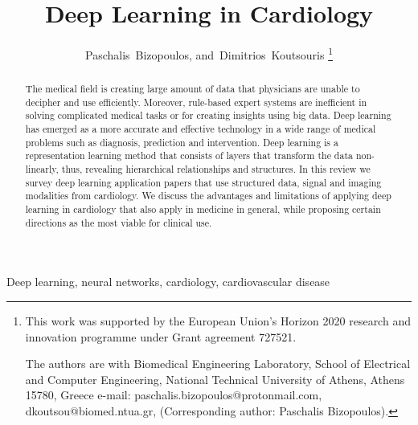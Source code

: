 \documentclass[journal]{IEEEtran}
\begin{document}
\title{Deep Learning in Cardiology}
\author{Paschalis~Bizopoulos, and~Dimitrios~Koutsouris
\thanks{This work was supported by the European Union's Horizon 2020 research and innovation programme under Grant agreement 727521. 

The authors are with Biomedical Engineering Laboratory, School of Electrical and Computer Engineering, National Technical University of Athens, Athens 15780, Greece e-mail: paschalis.bizopoulos@protonmail.com, dkoutsou@biomed.ntua.gr, (Corresponding author: Paschalis Bizopoulos).}}

\IEEEoverridecommandlockouts
{}
\maketitle
\IEEEpubidadjcol

\begin{abstract}
	The medical field is creating large amount of data that physicians are unable to decipher and use efficiently.
	Moreover, rule-based expert systems are inefficient in solving complicated medical tasks or for creating insights using big data.
	Deep learning has emerged as a more accurate and effective technology in a wide range of medical problems such as diagnosis, prediction and intervention.
	Deep learning is a representation learning method that consists of layers that transform the data non-linearly, thus, revealing hierarchical relationships and structures.
	In this review we survey deep learning application papers that use structured data, signal and imaging modalities from cardiology.
	We discuss the advantages and limitations of applying deep learning in cardiology that also apply in medicine in general, while proposing certain directions as the most viable for clinical use.
\end{abstract}

\begin{IEEEkeywords}
	Deep learning, neural networks, cardiology, cardiovascular disease
\end{IEEEkeywords}
\end{document}
